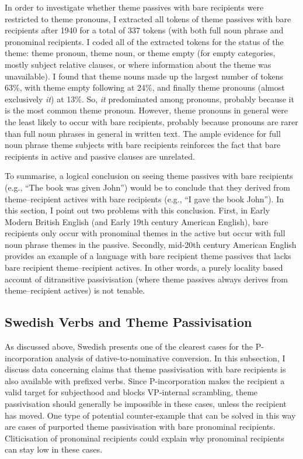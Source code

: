 In order to investigate whether theme passives with bare recipients were restricted to theme pronouns, I extracted all tokens of theme passives with bare recipients after 1940 for a total of 337 tokens (with both full noun phrase and pronominal recipients. I coded all of the extracted tokens for the status of the theme: theme pronoun, theme noun, or theme empty (for empty categories, mostly subject relative clauses, or where information about the theme was unavailable). I found that theme nouns made up the largest number of tokens 63\%, with theme empty following at 24\%, and finally theme pronouns (almost exclusively \textit{it}) at 13\%. So, \textit{it} predominated among pronouns, probably because it is the most common theme pronoun. However, theme pronouns in general were the least likely to occur with bare recipients, probably because pronouns are rarer than full noun phrases in general in written text. The ample evidence for full noun phrase theme subjects with bare recipients reinforces the fact that bare recipients in active and passive clauses are unrelated.

To summarise, a logical conclusion on seeing theme passives with bare recipients (e.g., ``The book was given John'') would be to conclude that they derived from theme--recipient actives with bare recipients (e.g., ``I gave the book John''). In this section, I point out two problems with this conclusion. First, in Early Modern British English (and Early 19th century American English), bare recipients only occur with pronominal themes in the active but occur with full noun phrase themes in the passive. Secondly, mid-20th century American English provides an example of a language with bare recipient theme passives that lacks bare recipient theme--recipient actives. In other words, a purely locality based account of ditransitive passivisation (where theme passives always derives from theme--recipient actives) is not tenable.

\subsection{Swedish Verbs and Theme Passivisation}
As discussed above, Swedish presents one of the clearest cases for the P-incorporation analysis of dative-to-nominative conversion. In this subsection, I discuss data concerning claims that theme passivisation with bare recipients is also available with prefixed verbs. Since P-incorporation makes the recipient a valid target for subjecthood and blocks VP-internal scrambling, theme passivisation should generally be impossible in these cases, unless the recipient has moved. One type of potential counter-example that can be solved in this way are cases of purported theme passivisation with bare pronominal recipients. Cliticisation of pronominal recipients could explain why pronominal recipients can stay low in these cases.

